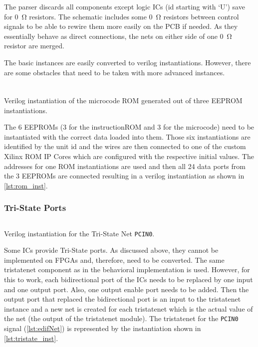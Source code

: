 The parser discards all components except logic \glspl{IC} (id starting with `U') save for \qty{0}{\ohm} resistors.
The schematic includes some \qty{0}{\ohm} resistors between control signals to be able to rewire them more easily on the \gls{PCB} if needed.
As they essentially behave as direct connections, the nets on either side of one \qty{0}{\ohm} resistor are merged.

The basic instances are easily converted to verilog instantiations.
However, there are some obstacles that need to be taken with more advanced instances.
\subsubsection{}
\begin{listing}[t]
  \inputminted[linenos,
    breaklines,
    firstline=1364,
    lastline=1368,
    frame=leftline,
    xleftmargin=20pt,
  ]{Verilog}{src/generated.v}
  \caption{Verilog instantiation of the microcode ROM generated out of three \gls{EEPROM} instantiations.}
  \label{lst:rom_inst}
\end{listing}
The 6 \glspl{EEPROM} (3 for the instructionROM and 3 for the microcode) need to be instantiated with the correct data loaded into them.
Those six instantiations are identified by the unit id and the wires are then connected to one of the custom Xilinx ROM IP Cores which are configured with the respective initial values.
The addresses for one ROM instantiations are used and then all 24 data ports from the 3 \glspl{EEPROM} are connected resulting in a verilog instantiation as shown in \cref{lst:rom_inst}.
\subsubsection{Tri-State Ports}
\begin{listing}[t]
  \inputminted[linenos,
    breaklines,
    firstline=1794,
    lastline=1801,
    frame=leftline,
    xleftmargin=20pt,
  ]{Verilog}{src/generated.v}
\caption{Verilog instantiation for the Tri-State Net \texttt{PCIN0}.}
  \label{lst:tristate_inst}
\end{listing}
Some \glspl{IC} provide Tri-State ports.
As discussed above, they cannot be implemented on \glspl{FPGA} and, therefore, need to be converted.
The same tristatenet component as in the behavioral implementation is used.
However, for this to work, each bidirectional port of the \glspl{IC} needs to be replaced by one input and one output port.
Also, one output enable port needs to be added.
Then the output port that replaced the bidirectional port is an input to the tristatenet instance and a new net is created for each tristatenet which is the actual value of the net (the output of the tristatenet module).
The tristatenet for the \texttt{PCIN0} signal (\cref{lst:edifNet}) is represented by the instantiation shown in \cref{lst:tristate_inst}.

